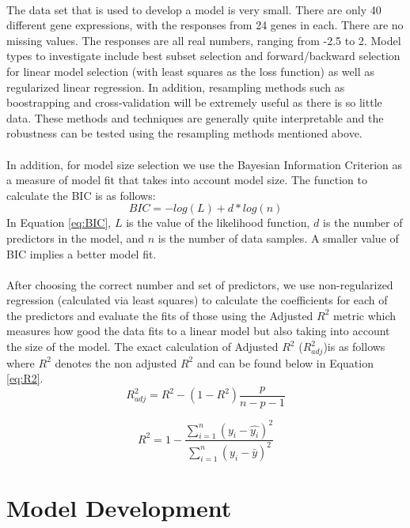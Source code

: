 \documentclass{article}
\begin{document}
\null\\
%
The data set that is used to develop a model is very small.  There are only 40 different gene expressions, with the responses from 24 genes
in each.  There are no missing values.  The responses are all real numbers, ranging from -2.5 to 2.  Model types to investigate include best subset selection and forward/backward selection for linear model selection (with least squares as the loss function) as well as regularized linear regression.  In addition, resampling methods such as boostrapping and cross-validation will be extremely useful as there is so little data.  These methods and techniques are generally quite interpretable and the robustness can be tested using the resampling methods mentioned above.\\
\null\\
In addition, for model size selection we use the Bayesian Information Criterion as a measure of model fit that takes into account model size.  The function to calculate the BIC is as follows:
\begin{equation}
BIC=-log(L)+d*log(n)
\label{eq:BIC}
\end{equation}
In Equation \ref{eq:BIC}, $L$ is the value of the likelihood function, $d$ is the number of predictors in the model, and $n$ is the number of data samples.  A smaller value of BIC implies a better model fit.  \\
\null\\
After choosing the correct number and set of predictors, we use non-regularized regression (calculated via least squares) to calculate the coefficients for each of the predictors and evaluate the fits of those using the Adjusted $R^2$ metric which measures how good the data fits to a linear model but also taking into account the size of the model.  The exact calculation of Adjusted $R^2$ ($R^2_{adj}$)is as follows where $R^2$ denotes the non adjusted $R^2$ and can be found below in Equation \ref{eq:R2}.
\begin{equation}
R^2_{adj} = R^2-(1-R^2)\frac{p}{n-p-1}
\label{eq:AdjR2}
\end{equation}

\begin{equation}
	R^2=1-\frac{\sum_{i=1}^n (y_i-\hat{y_i})^2}{\sum_{i=1}^n (y_i-\bar{y})^2}
	\label{eq:R2}
\end{equation}
%
\section{Model Development}
\end{document}
